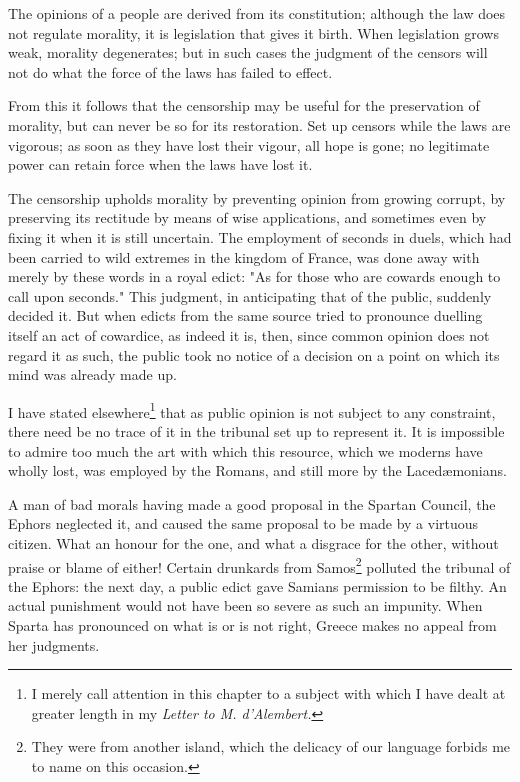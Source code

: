 \documentclass[12pt]{report}
\begin{document}
The opinions of a people are derived from its constitution; although the law does not regulate morality, it is legislation that gives it birth. When legislation grows weak, morality degenerates; but in such cases the judgment of the censors will not do what the force of the laws has failed to effect.

From this it follows that the censorship may be useful for the preservation of morality, but can never be so for its restoration. Set up censors while the laws are vigorous; as soon as they have lost their vigour, all hope is gone; no legitimate power can retain force when the laws have lost it.

The censorship upholds morality by preventing opinion from growing corrupt, by preserving its rectitude by means of wise applications, and sometimes even by fixing it when it is still uncertain. The employment of seconds in duels, which had been carried to wild extremes in the kingdom of France, was done away with merely by these words in a royal edict: "As for those who are cowards enough to call upon seconds." This judgment, in anticipating that of the public, suddenly decided it. But when edicts from the same source tried to pronounce duelling itself an act of cowardice, as indeed it is, then, since common opinion does not regard it as such, the public took no notice of a decision on a point on which its mind was already made up.

I have stated elsewhere\footnote{I merely call attention in this chapter to a subject with which I have dealt at greater length in my \textit{Letter to M. d'Alembert.}} that as public opinion is not subject to any constraint, there need be no trace of it in the tribunal set up to represent it. It is impossible to admire too much the art with which this resource, which we moderns have wholly lost, was employed by the Romans, and still more by the Lacedæmonians.

A man of bad morals having made a good proposal in the Spartan Council, the Ephors neglected it, and caused the same proposal to be made by a virtuous citizen. What an honour for the one, and what a disgrace for the other, without praise or blame of either! Certain drunkards from Samos\footnote{They were from another island, which the delicacy of our language forbids me to name on this occasion.} polluted the tribunal of the Ephors: the next day, a public edict gave Samians permission to be filthy. An actual punishment would not have been so severe as such an impunity. When Sparta has pronounced on what is or is not right, Greece makes no appeal from her judgments.
\end{document}
